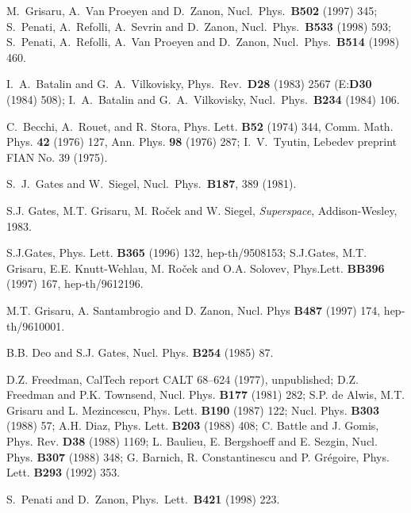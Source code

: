 \documentclass[a4paper,12pt]{article}
\begin{document}
\begin{thebibliography}{999}

 M.~Grisaru, A.~Van Proeyen and D.~Zanon,
  Nucl.\ Phys.\ {\bf B502} (1997) 345; S.~Penati, A.~Refolli,
  A.~Sevrin and D.~Zanon,
   Nucl.\ Phys.\  {\bf B533} (1998) 593; S.~Penati, A.~Refolli,
   A.~Van Proeyen and D.~Zanon, 
   Nucl.\ Phys.\  {\bf B514} (1998) 460.


  I.~A.~Batalin and G.~A.~Vilkovisky, 
  Phys.\ Rev.\ {\bf D28} (1983) 2567 (E:{\bf D30} (1984) 508);
  I.~A.~Batalin and G.~A.~Vilkovisky, 
  Nucl.\ Phys.\ {\bf  B234} (1984) 106.

 C.~Becchi, A.~Rouet, and R. Stora, Phys. Lett. {\bf B52} (1974) 344,
 Comm. Math. Phys. {\bf 42} (1976) 127,  
Ann. Phys. {\bf 98} (1976) 287; I.~V.~Tyutin, Lebedev preprint FIAN
No. 39 (1975). 

S.~J.~Gates and W.~Siegel,
Nucl.\ Phys.\  {\bf B187}, 389 (1981).

  S.J. Gates, M.T. Grisaru, M. Ro\v{c}ek and W. Siegel,
  {\em Superspace}, Addison-Wesley, 1983.

  S.J.Gates, Phys. Lett. {\bf B365} (1996) 132, hep-th/9508153;
  S.J.Gates, M.T. Grisaru, E.E. Knutt-Wehlau, M. Ro\v{c}ek and O.A. Solovev,
  Phys.Lett. {\bf BB396} (1997) 167, hep-th/9612196.

  M.T. Grisaru, A. Santambrogio and D. Zanon,
  Nucl. Phys {\bf B487} (1997) 174, hep-th/9610001.

  B.B. Deo and S.J. Gates, Nucl. Phys. {\bf B254} (1985) 87.
  

D.Z. Freedman, CalTech report CALT 68--624 (1977),
unpublished; D.Z. Freedman and P.K. Townsend, Nucl. Phys. {\bf B177}
(1981) 282; 
S.P. de Alwis, M.T. Grisaru and L. Mezincescu, Phys. Lett. {\bf B190}
(1987) 122; Nucl. Phys. {\bf B303} (1988) 57;
A.H. Diaz, Phys. Lett. {\bf B203} (1988) 408;
C. Battle and J. Gomis, Phys. Rev. {\bf D38} (1988) 1169;
L. Baulieu, E. Bergshoeff and E. Sezgin, Nucl. Phys. {\bf B307} (1988)
348; G. Barnich, R. Constantinescu and P. Gr\'egoire, Phys. Lett. {\bf B293}
(1992) 353.


  S.~Penati and D.~Zanon,
  Phys.\ Lett.\  {\bf B421} (1998) 223.



\end{thebibliography}
\end{document}
